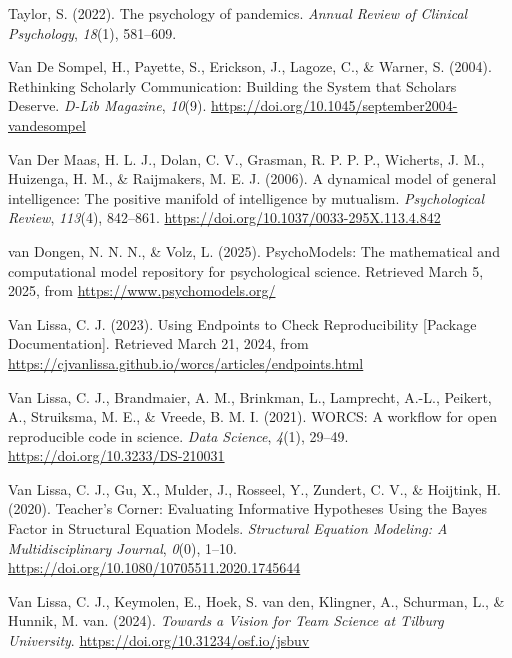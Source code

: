 \documentclass[
  man, noextraspace,floatsintext]{apa6}
\newlength{\cslhangindent}
\newenvironment{CSLReferences}[2] %
 {\begin{list}{}{%
  \setlength{\itemindent}{0pt}
  \setlength{\leftmargin}{0pt}
  \setlength{\parsep}{0pt}
  \ifodd #1
   \setlength{\leftmargin}{\cslhangindent}
   \setlength{\itemindent}{-1\cslhangindent}
  \fi
  \setlength{\itemsep}{#2\baselineskip}}}
 {\end{list}}
\begin{document}
\begin{CSLReferences}{1}{0}
Taylor, S. (2022). The psychology of pandemics. \emph{Annual Review of Clinical Psychology}, \emph{18}(1), 581--609.

Van De Sompel, H., Payette, S., Erickson, J., Lagoze, C., \& Warner, S. (2004). Rethinking {Scholarly Communication}: {Building} the {System} that {Scholars Deserve}. \emph{D-Lib Magazine}, \emph{10}(9). \url{https://doi.org/10.1045/september2004-vandesompel}

Van Der Maas, H. L. J., Dolan, C. V., Grasman, R. P. P. P., Wicherts, J. M., Huizenga, H. M., \& Raijmakers, M. E. J. (2006). A dynamical model of general intelligence: {The} positive manifold of intelligence by mutualism. \emph{Psychological Review}, \emph{113}(4), 842--861. \url{https://doi.org/10.1037/0033-295X.113.4.842}

van Dongen, N. N. N., \& Volz, L. (2025). {PsychoModels}: {The} mathematical and computational model repository for psychological science. Retrieved March 5, 2025, from \url{https://www.psychomodels.org/}

Van Lissa, C. J. (2023). Using {Endpoints} to {Check Reproducibility} {[}Package Documentation{]}. Retrieved March 21, 2024, from \url{https://cjvanlissa.github.io/worcs/articles/endpoints.html}

Van Lissa, C. J., Brandmaier, A. M., Brinkman, L., Lamprecht, A.-L., Peikert, A., Struiksma, M. E., \& Vreede, B. M. I. (2021). {WORCS}: {A} workflow for open reproducible code in science. \emph{Data Science}, \emph{4}(1), 29--49. \url{https://doi.org/10.3233/DS-210031}

Van Lissa, C. J., Gu, X., Mulder, J., Rosseel, Y., Zundert, C. V., \& Hoijtink, H. (2020). Teacher's {Corner}: {Evaluating Informative Hypotheses Using} the {Bayes Factor} in {Structural Equation Models}. \emph{Structural Equation Modeling: A Multidisciplinary Journal}, \emph{0}(0), 1--10. \url{https://doi.org/10.1080/10705511.2020.1745644}

Van Lissa, C. J., Keymolen, E., Hoek, S. van den, Klingner, A., Schurman, L., \& Hunnik, M. van. (2024). \emph{Towards a {Vision} for {Team Science} at {Tilburg University}}. \url{https://doi.org/10.31234/osf.io/jsbuv}


\end{CSLReferences}
\end{document}
